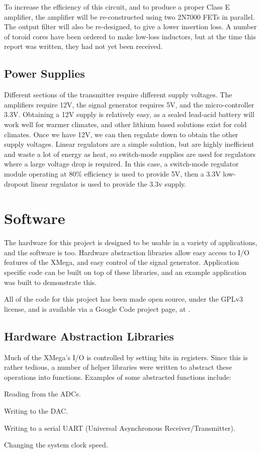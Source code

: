 \documentclass[a4paper,12pt]{article}
\newenvironment{packed_itemize}{
\begin{itemize}
  \setlength{\itemsep}{1pt}
  \setlength{\parskip}{0pt}
  \setlength{\parsep}{0pt}
}{\end{itemize}}
\begin{document}
To increase the efficiency of this circuit, and to produce a proper Class E amplifier, the amplifier will be re-constructed using two 2N7000 FETs in parallel. The output filter will also be re-designed, to give a lower insertion loss. A number of toroid cores have been ordered to make low-loss inductors, but at the time this report was written, they had not yet been received. 

\subsection{Power Supplies}
Different sections of the transmitter require different supply voltages. The amplifiers require 12V, the signal generator requires 5V, and the micro-controller 3.3V. 
Obtaining a 12V supply is relatively easy, as a sealed lead-acid battery will work well for warmer climates, and other lithium based solutions exist for cold climates. Once we have 12V, we can then regulate down to obtain the other supply voltages. Linear regulators are a simple solution, but are highly inefficient and waste a lot of energy as heat, so switch-mode supplies are used for regulators where a large voltage drop is required. In this case, a switch-mode regulator module operating at 80\% efficiency is used to provide 5V, then a 3.3V low-dropout linear regulator is used to provide the 3.3v supply.

\section{Software}
The hardware for this project is designed to be usable in a variety of applications, and the software is too. Hardware abstraction libraries allow easy access to I/O features of the XMega, and easy control of the signal generator. Application specific code can be built on top of these libraries, and an example application was built to demonstrate this. 

All of the code for this project has been made open source, under the GPLv3 license, and is available via a Google Code project page, at \citep{ref:gcode}.

\subsection{Hardware Abstraction Libraries}
Much of the XMega's I/O is controlled by setting bits in registers. Since this is rather tedious, a number of helper libraries were written to abstract these operations into functions. Examples of some abstracted functions include:
\begin{packed_itemize}
\item Reading from the ADCs.
\item Writing to the DAC.
\item Writing to a serial UART (Universal Asynchronous Receiver/Transmitter).
\item Changing the system clock speed.
\end{packed_itemize}
\end{document}
